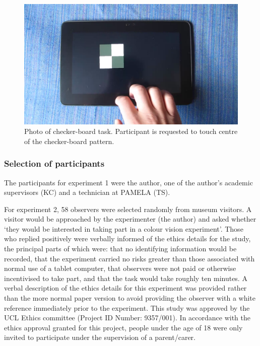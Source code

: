 \begin{figure}[hbtp]
\includegraphics[max width=\textwidth]{figs/tablet/checker_board.png} %
\caption{Photo of checker-board task. Participant is requested to touch centre of the checker-board pattern.}
\label{fig:checker-board}
\end{figure}


\subsubsection{Selection of participants}

The participants for experiment 1 were the author, one of the author's academic supervisors (KC) and a technician at \acrshort{PAMELA} (TS).

For experiment 2, 58 observers were selected randomly from museum visitors. A visitor would be approached by the experimenter (the author) and asked whether `they would be interested in taking part in a colour vision experiment'. Those who replied positively were verbally informed of the ethics details for the study, the principal parts of which were: that no identifying information would be recorded, that the experiment carried no risks greater than those associated with normal use of a tablet computer, that observers were not paid or otherwise incentivised to take part, and that the task would take roughly ten minutes. A verbal description of the ethics details for this experiment was provided rather than the more normal paper version to avoid providing the observer with a white reference immediately prior to the experiment. This study was approved by the \gls{UCL} Ethics committee (Project ID Number: 9357/001). In accordance with the ethics approval granted for this project, people under the age of 18 were only invited to participate under the supervision of a parent/carer. %

